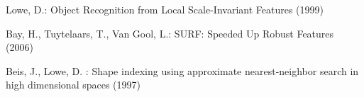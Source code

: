 %
%
\begin{thebibliography}{3}
%
Lowe, D.:
Object Recognition from Local Scale-Invariant Features (1999)

Bay, H., Tuytelaars, T., Van Gool, L.:
SURF: Speeded Up Robust Features (2006)

Beis, J., Lowe, D. : Shape indexing using approximate nearest-neighbor search in high dimensional spaces (1997)

\end{thebibliography}